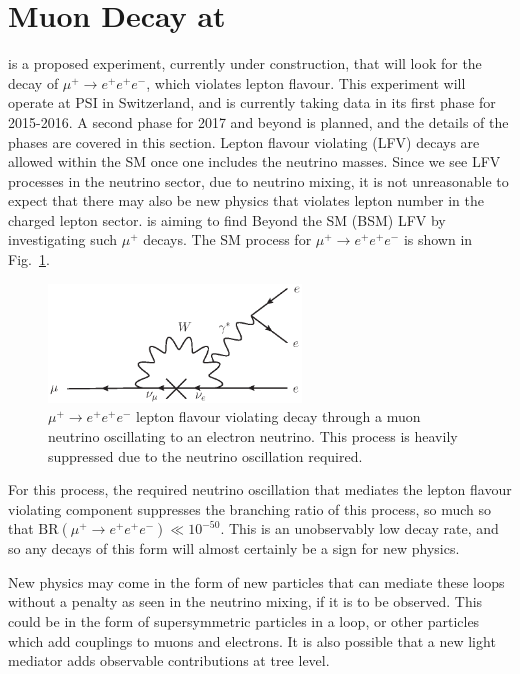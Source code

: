 \section{Muon Decay at \mueee}
\label{sec:mu3e_experiment}
\mueee \cite{Blondel:2013ia} is a proposed experiment, currently under construction, that will look for the decay of $\mu^+ \rightarrow e^+ e^+ e^-$, which violates lepton flavour.
This experiment will operate at PSI in Switzerland, and is currently taking data in its first phase for 2015-2016.
A second phase for 2017 and beyond is planned, and the details of the phases are covered in this section. 
Lepton flavour violating (LFV) decays are allowed within the SM once one includes the neutrino masses.
Since we see LFV processes in the neutrino sector, due to neutrino mixing, it is not unreasonable to expect that there may also be new physics that violates lepton number in the charged lepton sector.
\mueee is aiming to find Beyond the SM (BSM) LFV by investigating such $\mu^+$ decays.
The SM process for $\mu^+ \rightarrow e^+ e^+ e^-$ is shown in Fig.~\ref{fig:mu_eee_SM}.
\begin{figure}[h]
    \centering
    \includegraphics[width = 0.6\textwidth]{Figures/feynman_diagrams/mu_eee_SM.eps}
    \caption{$\mu^+ \rightarrow e^+ e^+ e^-$ lepton flavour violating decay through a muon neutrino oscillating to an electron neutrino. This process is heavily suppressed due to the neutrino oscillation required.}
    \label{fig:mu_eee_SM}
\end{figure}
For this process, the required neutrino oscillation that mediates the lepton flavour violating component suppresses the branching ratio of this process, so much so that $\textrm{BR}(\mu^+ \rightarrow e^+ e^+ e^-) \ll 10^{-50}$.
This is an unobservably low decay rate, and so any decays of this form will almost certainly be a sign for new physics.

New physics may come in the form of new particles that can mediate these loops without a penalty as seen in the neutrino mixing, if it is to be observed.
This could be in the form of supersymmetric particles in a loop, or other particles which add couplings to muons and electrons.
It is also possible that a new light mediator adds observable contributions at tree level.

